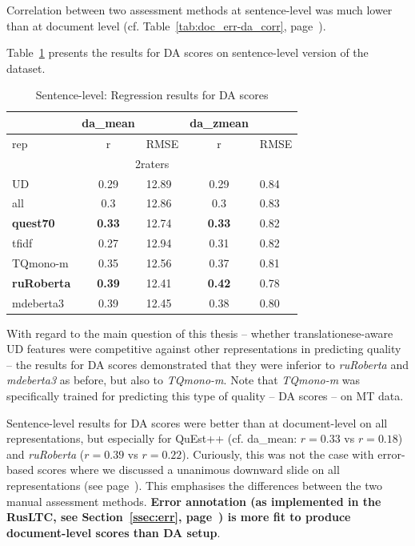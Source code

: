 Correlation between two assessment methods at sentence-level was much lower than at document level (cf. Table~\ref{tab:doc_err-da_corr}, page~\pageref{tab:doc_err-da_corr}).

Table~\ref{tab:da_sent_res} presents the results for DA scores on sentence-level version of the dataset. 

\begin{table}[H]
	\centering
	\begin{tabular}{l|cl|cl}
		\toprule
		& da\_mean &      & da\_zmean &      \\
		\midrule
		rep             & r         & RMSE & r          & RMSE \\
		\midrule
		\multicolumn{5}{c}{2raters}     \\ 
		\midrule
		UD              & 0.29 & 12.89 & 0.29 & 0.84 \\
		all             & 0.3  & 12.86 & 0.3  & 0.83 \\
		\textbf{quest70}         & \textbf{0.33} & 12.74 & \textbf{0.33} & 0.82 \\
		\midrule
		tfidf           & 0.27 & 12.94 & 0.31 & 0.82 \\
		\midrule
		TQmono-m        & 0.35 & 12.56 & 0.37 & 0.81 \\
		\textbf{ruRoberta} & \textbf{0.39} & 12.41 & \boxit{0.4in}\textbf{0.42} & 0.78 \\
		mdeberta3  & 0.39 & 12.45 & 0.38 & 0.80 \\
		\bottomrule
	\end{tabular}
	\caption{\label{tab:da_sent_res}Sentence-level: Regression results for DA scores}
\end{table}

With regard to the main question of this thesis -- whether translationese-aware UD features were competitive against other representations in predicting quality -- the results for DA scores demonstrated that they were inferior to \textit{ruRoberta} and \textit{mdeberta3} as before, but also to \textit{TQmono-m}. Note that \textit{TQmono-m} was specifically trained for predicting this type of quality -- DA scores -- on MT data. 

\label{pg:no_slide_for_da_when_moving_to_sent}
Sentence-level results for DA scores were better than at document-level on all representations, but especially for QuEst++ (cf. da\_mean: $r=0.33$ vs $r=0.18$) and \textit{ruRoberta} ($r=0.39$ vs $r=0.22$). Curiously, this was not the case with error-based scores where we discussed a unanimous downward slide on all representations (see page~\pageref{pg:downward_slide}). 
This emphasises the differences between the two manual assessment methods. \textbf{Error annotation (as implemented in the \gls{RusLTC}, see Section~\ref{ssec:err}, page~\pageref{ssec:err}) is more fit to produce document-level scores than DA setup}. 

